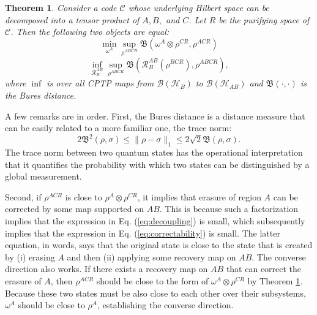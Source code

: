 \documentclass[a4paper,11pt]{article}
\newcommand{\1}{\mathbbm{1}}
\newtheorem{thm}{Theorem}
\begin{document}
\begin{thm}\label{thm:decoupling}
	\cite{Flammia2016} Consider a code $\mathcal{C}$ whose underlying Hilbert space can be decomposed into a tensor product of $A,B,$ and $C$. Let $R$ be the purifying space of $\mathcal{C}$.
	Then the following two objects are equal:
	\begin{equation}
		\min_{\omega^A} \sup_{\rho^{ABCR}} \mathfrak{B}(\omega^A \otimes \rho^{CR},\rho^{ACR})\label{eq:decoupling}
	\end{equation}
	\begin{equation}
		\inf_{\mathcal{R}_B^{AB}}\sup_{\rho^{ABCR}}\mathfrak{B}(\mathcal{R}_B^{AB}(\rho^{BCR}), \rho^{ABCR}),\label{eq:correctability}
	\end{equation}
	where $\inf$ is over all CPTP maps from $\mathcal{B}(\mathcal{H}_B)$ to $\mathcal{B}(\mathcal{H}_{AB})$ and $\mathfrak{B}(\cdot, \cdot)$ is the Bures distance.
\end{thm}

A few remarks are in order. First, the Bures distance is a distance measure that can be easily related to a more familiar one, the trace norm:
\begin{equation}
	2\mathfrak{B}^2(\rho,\sigma)\leq \|\rho-\sigma \|_1 \leq 2\sqrt{2}\mathfrak{B}(\rho,\sigma).\label{eq:Bures_Trace}
\end{equation}
The trace norm between two quantum states has the operational interpretation that it quantifies the probability with which two states can be distinguished by a global measurement.

Second, if $\rho^{ACR}$ is close to $\rho^{A} \otimes \rho^{CR}$, it implies that erasure of region $A$ can be corrected by some map supported on $AB$. This is because
such a factorization implies that the expression in Eq. (\ref{eq:decoupling}) is small, which subsequently implies that the expression in Eq. (\ref{eq:correctability}) is small. The latter equation, in words, says
that the original state is close to the state that is created by (i) erasing $A$ and then (ii) applying some recovery map on $AB$. The converse direction also works. If
there exists a recovery map on $AB$ that can correct the erasure of $A$, then $\rho^{ACR}$ should be close to the form of $\omega^A \otimes \rho^{CR}$ by Theorem \ref{thm:decoupling}.
Because these two states must be also close to each other over their subsystems, $\omega^A$ should be close to $\rho^A$, establishing the converse direction.
\end{document}
